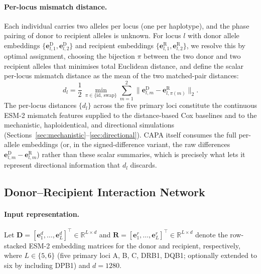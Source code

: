\documentclass[11pt,a4paper]{article}
\begin{document}
\paragraph{Per-locus mismatch distance.}
Each individual carries two alleles per locus (one per haplotype), and the
phase pairing of donor to recipient alleles is unknown.  For locus $l$ with
donor allele embeddings $\{\mathbf{e}^{\mathrm{D}}_{l,1},
\mathbf{e}^{\mathrm{D}}_{l,2}\}$ and recipient embeddings
$\{\mathbf{e}^{\mathrm{R}}_{l,1}, \mathbf{e}^{\mathrm{R}}_{l,2}\}$, we resolve
this by optimal assignment, choosing the bijection $\pi$ between the two donor
and two recipient alleles that minimises total Euclidean distance, and define
the scalar per-locus mismatch distance as the mean of the two matched-pair
distances:
\begin{equation}
  d_l = \frac{1}{2}\,
        \min_{\pi \in \{\mathrm{id},\,\mathrm{swap}\}}
        \sum_{m=1}^{2}
        \bigl\lVert \mathbf{e}^{\mathrm{D}}_{l,m}
                   - \mathbf{e}^{\mathrm{R}}_{l,\pi(m)} \bigr\rVert_2 .
  \label{eq:locus_distance}
\end{equation}
The per-locus distances $\{d_l\}$ across the five primary loci constitute the
continuous ESM-2 mismatch features supplied to the distance-based Cox baselines
and to the mechanistic, haploidentical, and directional simulations
(Sections~\ref{sec:mechanistic}--\ref{sec:directional}).  CAPA itself consumes
the full per-allele embeddings (or, in the signed-difference variant, the raw
differences $\mathbf{e}^{\mathrm{D}}_{l,m} - \mathbf{e}^{\mathrm{R}}_{l,m}$)
rather than these scalar summaries, which is precisely what lets it represent
directional information that $d_l$ discards.

\subsection{Donor--Recipient Interaction Network}
\label{sec:interaction}

\paragraph{Input representation.}
Let $\mathbf{D} = [\mathbf{e}^d_1, \ldots, \mathbf{e}^d_L]^\top \in
\mathbb{R}^{L \times d}$ and $\mathbf{R} = [\mathbf{e}^r_1, \ldots,
\mathbf{e}^r_L]^\top \in \mathbb{R}^{L \times d}$ denote the row-stacked
ESM-2 embedding matrices for the donor and recipient, respectively, where
$L \in \{5, 6\}$ (five primary loci A, B, C, DRB1, DQB1; optionally
extended to six by including DPB1) and $d = 1280$.
\end{document}
